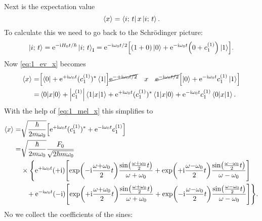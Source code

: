 \documentclass[11pt,letter, swedish, english
]{article}
\begin{document}
Next is the expectation value
\begin{equation}\label{eq:1_ev_x}
\ev{x}=\bra{i;\,t}x\ket{i;\,t}.
\end{equation}
To calculate this we need to go back to the Schrödinger picture:
\begin{equation}
\ket{i;\,t}=\mathrm{e}^{-\mathrm{i} H_0t/\hbar}\ket{i;\,t}_{\text{I}}
=\mathrm{e}^{-\mathrm{i}\omega_0t/2}\qty[
(1+0)\ket{0} + \mathrm{e}^{-\mathrm{i}\omega_0t}\qty(0+c_1^{(1)})\ket{1}].
\end{equation}
Now \eqref{eq:1_ev_x} becomes
\begin{equation}
\begin{aligned}
\ev{x}=&
\qty[\bra{0} + \ee^{+\ii\omega_0t}(c_1^{(1)})^*\bra{1}]
\cancel{\ee^{-+\ii\omega_0t/2}}
\quad x \quad
\cancel{\ee^{-\ii\omega_0t/2}}\qty[
\ket{0} + \ee^{-\ii\omega_0t}c_1^{(1)}\ket{1}]\\
=&\mel{0}{x}{0}+\abs{c_1^{(1)}}\mel{1}{x}{1}
+\ee^{+\ii\omega_0t}(c_1^{(1)})^*\mel{1}{x}{0}
+\ee^{-\ii\omega_0t}c_1^{(1)}\mel{0}{x}{1}.
\end{aligned}
\end{equation}
With the help of \eqref{eq:1_mel_x} this simplifies to
\begin{equation}
\begin{aligned}
\ev{x}=&\sqrt{\frac{\hbar}{2m\omega_0}}
\qty[\ee^{+\ii\omega_0t}(c_1^{(1)})^*
+\ee^{-\ii\omega_0t}c_1^{(1)}]\\
=&\sqrt{\frac{\hbar}{2m\omega_0}}
\frac{ F_0}{\sqrt{2\hbar m\omega_0}}\\
&\times\Bigg\{
\ee^{+\ii\omega_0t}(+\ii)\qty[
\exp(-\ii\frac{\omega{+}\omega_0}{2}t)\frac{\sin(\frac{\omega+\omega_0}{2}t)}
{\omega+\omega_0}
+\exp(+\ii\frac{\omega{-}\omega_0}{2}t)\frac{\sin(\frac{\omega-\omega_0}{2}t)}
{\omega-\omega_0}
] \\ & \hspace{8.5pt}
+\ee^{-\ii\omega_0t}(-\ii)\qty[
\exp(+\ii\frac{\omega{+}\omega_0}{2}t)\frac{\sin(\frac{\omega+\omega_0}{2}t)}
{\omega+\omega_0}
+\exp(-\ii\frac{\omega{-}\omega_0}{2}t)\frac{\sin(\frac{\omega-\omega_0}{2}t)}
{\omega-\omega_0}
]
\Bigg\}.
\end{aligned}
\end{equation}
No we collect the coefficients of the sines:
\end{document}
